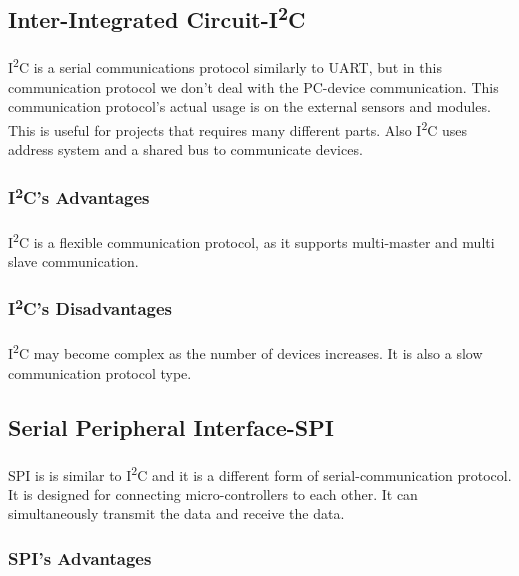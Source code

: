 \documentclass[pdftex,12pt,a4paper]{article}
\begin{document}
\begin{flushleft}
\subsection{Inter-Integrated Circuit-I\textsuperscript{2}C}
\paragraph{}
I\textsuperscript{2}C is a serial communications protocol similarly to UART, but in this communication protocol we don't deal with the PC-device communication. This communication protocol's actual usage is on the external sensors and modules. This is useful for projects that requires many different parts. Also I\textsuperscript{2}C uses address system and a shared bus to communicate devices.

\subsubsection{I\textsuperscript{2}C's Advantages}
\paragraph{}
I\textsuperscript{2}C is a flexible communication protocol, as it supports multi-master and multi slave communication.

\subsubsection{I\textsuperscript{2}C's Disadvantages}
\paragraph{}
I\textsuperscript{2}C may become complex as the number of devices increases. It is also a slow communication protocol type.

\subsection{Serial Peripheral Interface-SPI}
\paragraph{}
SPI is is similar to I\textsuperscript{2}C and it is a different form of serial-communication protocol. It is designed for connecting micro-controllers to each other. It can simultaneously transmit the data and receive the data. 

\subsubsection{SPI's Advantages}

\end{flushleft}
\end{document}
